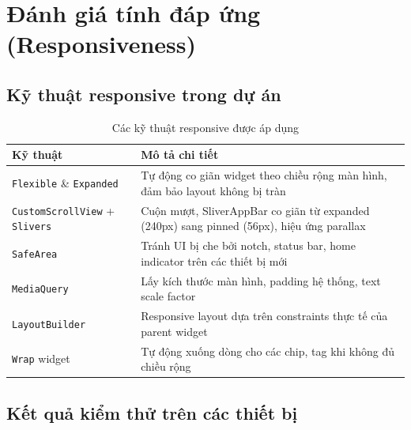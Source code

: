 
\section{Đánh giá tính đáp ứng (Responsiveness)}

\subsection{Kỹ thuật responsive trong dự án}

\begin{table}[H]
\centering
\caption{Các kỹ thuật responsive được áp dụng}
\begin{tabularx}{\textwidth}{|l|X|}
\hline
\textbf{Kỹ thuật} & \textbf{Mô tả chi tiết} \\
\hline
\texttt{Flexible} \& \texttt{Expanded} & Tự động co giãn widget theo chiều rộng màn hình, đảm bảo layout không bị tràn \\
\hline
\texttt{CustomScrollView} + \texttt{Slivers} & Cuộn mượt, SliverAppBar co giãn từ expanded (240px) sang pinned (56px), hiệu ứng parallax \\
\hline
\texttt{SafeArea} & Tránh UI bị che bởi notch, status bar, home indicator trên các thiết bị mới \\
\hline
\texttt{MediaQuery} & Lấy kích thước màn hình, padding hệ thống, text scale factor \\
\hline
\texttt{LayoutBuilder} & Responsive layout dựa trên constraints thực tế của parent widget \\
\hline
\texttt{Wrap} widget & Tự động xuống dòng cho các chip, tag khi không đủ chiều rộng \\
\hline
\end{tabularx}
\end{table}

\subsection{Kết quả kiểm thử trên các thiết bị}

